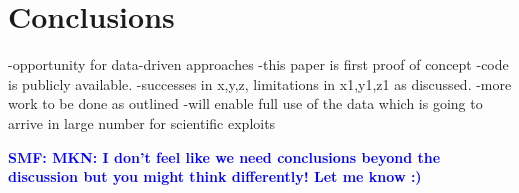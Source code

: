 \documentclass[a4paper,fleqn,usenatbib]{mnras}
\newcommand{\smf}[1]{\textbf{\textcolor{blue}{SMF: #1}}}
\newcommand{\mkn}[1]{\textbf{\textcolor{red}{MKN: #1}}}
\begin{document}






 
 



\section{Conclusions}
\label{sec:conclusions}
-opportunity for data-driven approaches
-this paper is first proof of concept
-code is publicly available. 
-successes in x,y,z, limitations in x1,y1,z1 as discussed.
-more work to be done as outlined
-will enable full use of the data which is going to arrive in large number for scientific exploits

\smf{MKN: I don't feel like we need conclusions beyond the discussion but you might think differently! Let me know :)}

\end{document}
